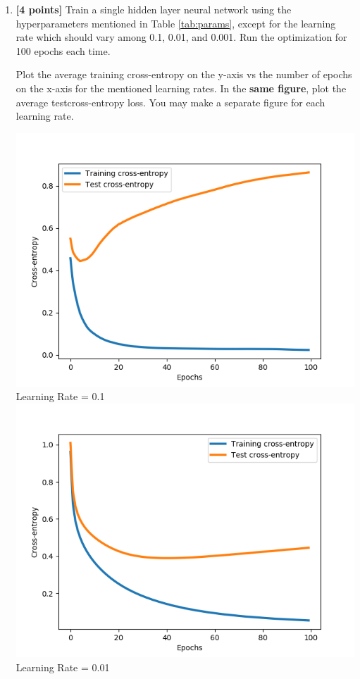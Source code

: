 \documentclass[11pt]{article}
\numberwithin{equation}{section} %
\numberwithin{figure}{section} %
\numberwithin{table}{section} %
\newcommand{\ntset}{test}
\newcommand{\points}[1]{{\bf [#1 points]}}
\begin{document}
\begin{enumerate}
\clearpage
\item \points{4} %
Train a single hidden layer neural network using the hyperparameters mentioned in Table \ref{tab:params}, except for the learning rate which should vary among 0.1, 0.01, and 0.001. Run the optimization for 100 epochs each time.

Plot the average training cross-entropy on the y-axis vs the number of epochs on the x-axis for the mentioned learning rates. In the \textbf{same figure}, plot the average \ntset\thinspace cross-entropy loss. You may make a separate figure for each learning rate.

 \begin{tcolorbox}[fit,height=18cm, width=15cm, blank, borderline={1pt}{-2pt}]
    \includegraphics[scale=0.4]{img/plot4.png} Learning Rate = 0.1\\
    \includegraphics[scale=0.4]{img/plot3.png} Learning Rate = 0.01\\

\end{tcolorbox}
\end{enumerate}
\end{document}
